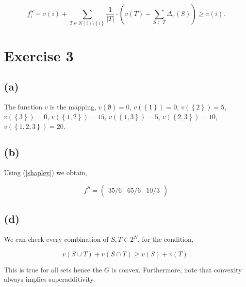 \documentclass[american]{scrartcl}
\newcommand{\set}[1]{\left\{#1\right\}}
\newcommand{\abs}[1]{\left\lvert #1 \right\rvert}
\begin{document}
\begin{equation}
    f^S_i = v(i) + \sum_{T \in N(i) \setminus \set{i} } \frac{1}{\abs{T}} \cdot \left( v(T) - \sum_{S \subset T} \Delta_v(S) \right) \geq v(i).
\end{equation}

\section*{Exercise 3}

\subsection*{(a)}

The function $v$ is the mapping, $v(\emptyset) = 0$,
$v(\set{1}) = 0$,
$v(\set{2}) = 5$,
$v(\set{3}) = 0$,
$v(\set{1, 2}) = 15$,
$v(\set{1, 3}) = 5$,
$v(\set{2, 3}) = 10$,
$v(\set{1, 2, 3}) = 20$.

\subsection*{(b)}

Using (\ref{shapley}) we obtain,

\begin{equation}
    f^S = \begin{pmatrix}
        35/6 & 65/6 & 10/3
    \end{pmatrix}
\end{equation}

\subsection*{(d)}
We can check every combination of $S, T \in 2^N$, for the condition,

\begin{equation}
    v\left(S \cup T\right) + v\left(S \cap T\right) \geq v(S) + v(T).
\end{equation}

This is true for all sets hence the $G$ is convex. Furthermore, note that convexity always implies superadditivity.
\end{document}
